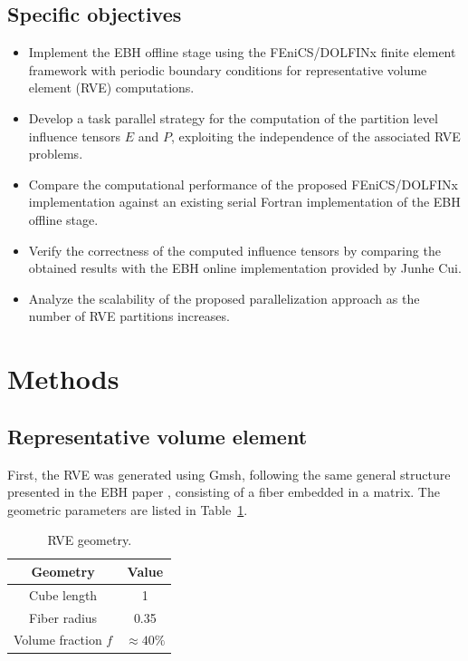 \documentclass[12pt]{article}
\begin{document}
\subsection{Specific objectives}

\begin{itemize}
    \item Implement the EBH offline stage using the FEniCS/DOLFINx finite element framework with periodic boundary conditions for representative volume element (RVE) computations.

    \item Develop a task parallel strategy for the computation of the partition level influence tensors $E$ and $P$, exploiting the independence of the associated RVE problems.

    \item Compare the computational performance of the proposed FEniCS/DOLFINx implementation against an existing serial Fortran implementation of the EBH offline stage.

    \item Verify the correctness of the computed influence tensors by comparing the obtained results with the EBH online implementation provided by Junhe Cui.

    \item Analyze the scalability of the proposed parallelization approach as the number of RVE partitions increases.
\end{itemize}

\section{Methods}
\subsection{Representative volume element}
First, the RVE was generated using Gmsh, following the same general structure presented in the EBH paper \cite{FishCuiEBH}, consisting of a fiber embedded in a matrix. The geometric parameters are listed in Table~\ref{tab:rve_geometry}.

\begin{table}[h!]
\centering
\caption{RVE geometry.}
\begin{tabular}{cc}
\hline
Geometry & Value \\
\hline
Cube length & 1 \\
Fiber radius & 0.35 \\
Volume fraction $f$ & $\approx 40\%$ \\
\hline
\end{tabular}
\label{tab:rve_geometry}
\end{table}
\end{document}
